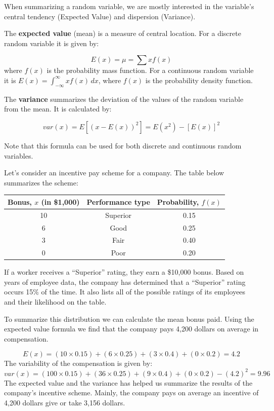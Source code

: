 \documentclass[
  11pt,
  letterpaper,
  DIV=11,
  numbers=noendperiod,
  oneside,
  open=any]{scrreprt}
\begin{document}
When summarizing a random variable, we are mostly interested in the
variable's central tendency (Expected Value) and dispersion (Variance).

The \textbf{expected value} (mean) is a measure of central location. For
a discrete random variable it is given by:

\begin{bsformula}

\[E(x)=\mu=\sum xf(x)\] where \(f(x)\) is the probability mass function.
For a continuous random variable it is
\(E(x)= \int_{-\infty}^{\infty} x f(x)\, dx\), where \(f(x)\) is the
probability density function.

\end{bsformula}

The \textbf{variance} summarizes the deviation of the values of the
random variable from the mean. It is calculated by:

\begin{bsformula}

\[var(x)=E[(x-E(x))^2]=E(x^2)-[E(x)]^2\]

\end{bsformula}

Note that this formula can be used for both discrete and continuous
random variables.

\begin{bsexample}[Example]

Let's consider an incentive pay scheme for a company. The table below
summarizes the scheme:

\begin{center}
\begin{tabular}{ccc}
\toprule
Bonus, \(x\) (in \$1,000) & Performance type & Probability, \(f(x)\) \\
\midrule
10 & Superior & 0.15 \\
6 & Good & 0.25 \\
3 & Fair & 0.40 \\
0 & Poor & 0.20 \\
\bottomrule
\end{tabular}
\end{center}

If a worker receives a ``Superior'' rating, they earn a \$10,000 bonus.
Based on years of employee data, the company has determined that a
``Superior'' rating occurs 15\% of the time. It also lists all of the
possible ratings of its employees and their likelihood on the table.

To summarize this distribution we can calculate the mean bonus paid.
Using the expected value formula we find that the company pays 4,200
dollars on average in compensation.

\[E(x)=(10 \times 0.15) + (6 \times 0.25) + (3 \times 0.4) + (0 \times 0.2)=4.2\]
The variability of the compensation is given by:
\[var(x)=(100 \times 0.15) + (36 \times 0.25) + (9 \times 0.4) + (0 \times 0.2)-(4.2)^2=9.96\]
The expected value and the variance has helped us summarize the results
of the company's incentive scheme. Mainly, the company pays on average
an incentive of 4,200 dollars give or take 3,156 dollars.

\end{bsexample}
\end{document}

